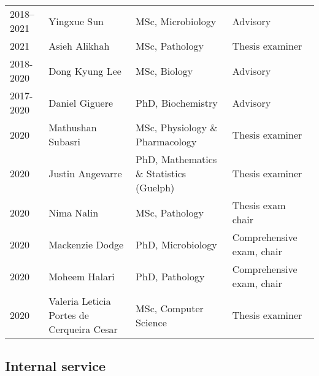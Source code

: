 \begin{tabular}{lp{1.3in}p{2.4in}p{1.4in}}
2018--2021 & Yingxue Sun & MSc, Microbiology & Advisory\\

2021 & Asieh Alikhah & MSc, Pathology & Thesis examiner\\

2018-2020 & Dong Kyung Lee & MSc, Biology & Advisory\\

2017-2020 & Daniel Giguere & PhD, Biochemistry & Advisory\\

2020 & Mathushan Subasri & MSc, Physiology \& Pharmacology & Thesis examiner\\

2020 & Justin Angevarre & PhD, Mathematics \& Statistics (Guelph) & Thesis examiner\\

2020 & Nima Nalin & MSc, Pathology & Thesis exam chair\\

2020 & Mackenzie Dodge & PhD, Microbiology & Comprehensive exam, chair\\

2020 & Moheem Halari & PhD, Pathology & Comprehensive exam, chair\\

2020 & Valeria Leticia Portes de Cerqueira Cesar & MSc, Computer Science & Thesis examiner\\

\hline
\end{tabular}




\vspace{1em}

\subsection {Internal service}





